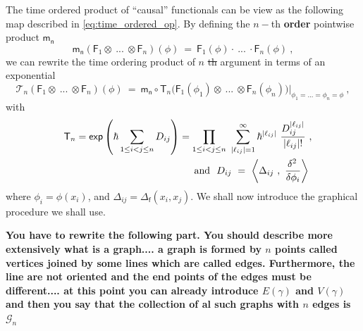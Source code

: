 \documentclass[11pt]{book}
\newcommand{\com}[1]{{\color{red}\bf #1}}
\newcommand{\sbar}[1]{\sout{\color{red} #1}}
\renewcommand{\exp}{\mathsf{exp}}
\newcommand{\abs}[1]{\left|#1\right|}
\newcommand{\sm}[1]{\left\langle#1\right\rangle}
\newcommand{\Gcal}{\mathcal{G}}
\newcommand{\Tcal}{\mathcal{T}}
\newcommand{\Fsf}{\mathsf{F}}
\newcommand{\Tsf}{\mathsf{T}}
\newcommand{\fsf}{\mathsf{f}}
\newcommand{\msf}{\mathsf{m}}
\newcommand{\nsf}{\mathsf{n}}
\theoremstyle{break}
\begin{document}
The  time ordered product of ``causal'' functionals can be view as the following map described in \eqref{eq:time_ordered_op}. By defining the \com{$n-$}th \com{order} pointwise product $\msf_\nsf$
%
\begin{equation*}
\msf_\nsf \left( \Fsf_1 \otimes \ ... \ \otimes \Fsf_n \right)(\phi) \ = \ \Fsf_1(\phi) \cdot \ ... \ \cdot \Fsf_n(\phi) \ ,
\end{equation*}
%
we can rewrite the time ordering product of $n$\sbar{th} argument in terms of an exponential
%
\begin{equation*}
\Tcal_n (\Fsf_1 \otimes \ ... \ \otimes \Fsf_n)(\phi) \ = \ \msf_\nsf \circ \Tsf_n \bigg( \Fsf_1(\phi_1) \otimes \ ... \ \otimes \Fsf_n(\phi_n) \bigg) \bigg|_{\phi_1 = ... = \phi_n = \phi} \ ,
\end{equation*}
%
with 
%
\begin{eqnarray*}
&&\Tsf_n = \exp\left(\hbar \sum_{1 \leq i < j \leq n} D_{ij}\right) =
\prod_{1 \leq i < j \leq n} \ \sum_{\abs{\ell_{ij}}=1}^\infty \hbar^{\abs{\ell_{ij}}} \ \frac{D_{ij}^{\abs{\ell_{ij}}}}{\abs{\ell_{ij}} !} \ , \\
&& \mbox{ and } \ D_{ij} \ = \ \sm{\Delta_{ij} \ , \ \frac{\delta^2 \hfil}{\delta \phi_i} } \ 
\end{eqnarray*}
%
where $\phi_i = \phi(x_i)$, and $\Delta_{ij}=\Delta_\fsf(x_i,x_j)$. We shall now introduce the graphical procedure we shall use. 

\com{You have to rewrite the following part. You should describe more extensively what is a graph.... a graph is formed by $n$ points called vertices joined by some lines which are called edges. Furthermore, the line are not oriented and the end points of the edges must be different.... at this point you can already introduce  $E(\gamma)$ and $V(\gamma)$ and then you say that the collection of al such graphs with $n$ edges is $\Gcal_n$}
\end{document}
